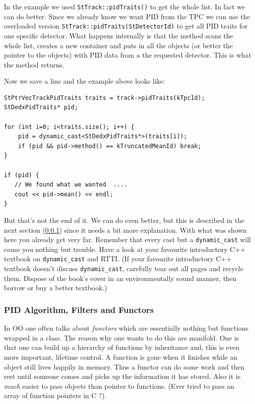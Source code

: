 \documentclass[twoside]{article}
\begin{document}
In the example we used \texttt{StTrack::pidTraits()} to get the whole
list. In fact we can do better.  Since we already know we want PID
from the TPC we can use the overloaded version
\texttt{StTrack::pidTraits(StDetectorId)} to get all PID traits for
one specific detector.  What happens internally is that the method
scans the whole list, creates a new container and puts in all the
objects (or better the pointer to the objects) with PID data from a
the requested detector. This is what the method returns.

Now we save a line and the example above looks like:
\begin{verbatim}
StPtrVecTrackPidTraits traits = track->pidTraits(kTpcId);
StDedxPidTraits* pid;

for (int i=0; i<traits.size(); i++) {
    pid = dynamic_cast<StDedxPidTraits*>(traits[i]);
    if (pid && pid->method() == kTruncatedMeanId) break;
}

if (pid) {
   // We found what we wanted  ....
   cout << pid->mean() << endl;
}
\end{verbatim}

But that's not the end of it. We can do even better, but this is
described in the next section (\ref{sec:pidAlgorithm}) since it needs
a bit more explanation. With what was shown here you already get very
far. Remember that every cast but a \texttt{dynamic\_cast} will cause
you nothing but trouble. Have a look at your favourite introductory
C++ textbook on \texttt{dynamic\_cast} and RTTI.  (If your favourite
introductory C++ textbook doesn't discuss \texttt{dynamic\_cast},
carefully tear out all pages and recycle them.  Dispose of the book's
cover in an environmentally sound manner, then borrow or buy a better
textbook.)

\subsubsection{PID Algorithm, Filters and Functors}
\label{sec:pidAlgorithm}
  
 In OO one often talks about
\emph{functors} which are essentially nothing but functions wrapped in
a class. The reason why one wants to do this are manifold. One is that
one can build up a hierarchy of functions by inheritance and, this is
even more important, lifetime control. A function is gone when it
finishes while an object still lives happily in memory. Thus a functor
can do some work and then rest until someone comes and picks up the
information it has stored.  Also it is \emph{much} easier to pass
objects than pointer to functions. (Ever tried to pass an array of
function pointers in C ?).
\end{document}
